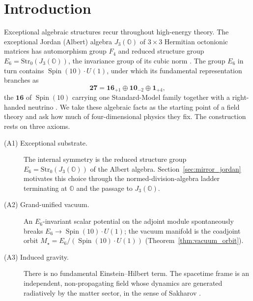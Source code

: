 \documentclass[aps,prd,preprint,longbibliography,nofootinbib,superscriptaddress,floatfix]{revtex4-2}
\newcommand{\Spin}{\operatorname{Spin}}
\begin{document}

\maketitle


\section{Introduction}
\label{sec:introduction}

Exceptional algebraic structures recur throughout high-energy theory. The
exceptional Jordan (Albert) algebra \(J_3(\mathbb O)\) of \(3\times3\)
Hermitian octonionic matrices has automorphism group \(F_4\) and reduced
structure group \(E_6=\mathrm{Str}_0(J_3(\mathbb O))\), the invariance group of
its cubic norm \cite{JordanVonNeumannWigner,SpringerVeldkamp,BaezOctonions}.
The group \(E_6\) in turn contains \(\Spin(10)\cdot U(1)\), under which its
fundamental representation branches as
\begin{equation}
    \mathbf{27}
    =
    \mathbf{16}_{+1}\oplus\mathbf{10}_{-2}\oplus\mathbf{1}_{+4},
    \label{eq:intro_27_branching}
\end{equation}
the \(\mathbf{16}\) of \(\Spin(10)\) carrying one Standard-Model family together
with a right-handed neutrino \cite{GeorgiSO10,FritzschMinkowski,Slansky}. We
take these algebraic facts as the starting point of a field theory and ask how
much of four-dimensional physics they fix. The construction rests on three
axioms.
\begin{description}
\item[\textnormal{(A1) Exceptional substrate.}] The internal symmetry is the
reduced structure group \(E_6=\mathrm{Str}_0(J_3(\mathbb O))\) of the Albert
algebra. Section~\ref{sec:mirror_jordan} motivates this choice through the
normed-division-algebra ladder terminating at \(\mathbb O\) and the passage to
\(J_3(\mathbb O)\).
\item[\textnormal{(A2) Grand-unified vacuum.}] An \(E_6\)-invariant scalar
potential on the adjoint module spontaneously breaks
\(E_6\to\Spin(10)\cdot U(1)\); the vacuum manifold is the coadjoint orbit
\(M_\star=E_6/(\Spin(10)\cdot U(1))\) (Theorem~\ref{thm:vacuum_orbit}).
\item[\textnormal{(A3) Induced gravity.}] There is no fundamental
Einstein--Hilbert term. The spacetime frame is an independent, non-propagating
field whose dynamics are generated radiatively by the matter sector, in the
sense of Sakharov \cite{SakharovInducedGravity,AdlerInducedGravity}.
\end{description}
\end{document}
